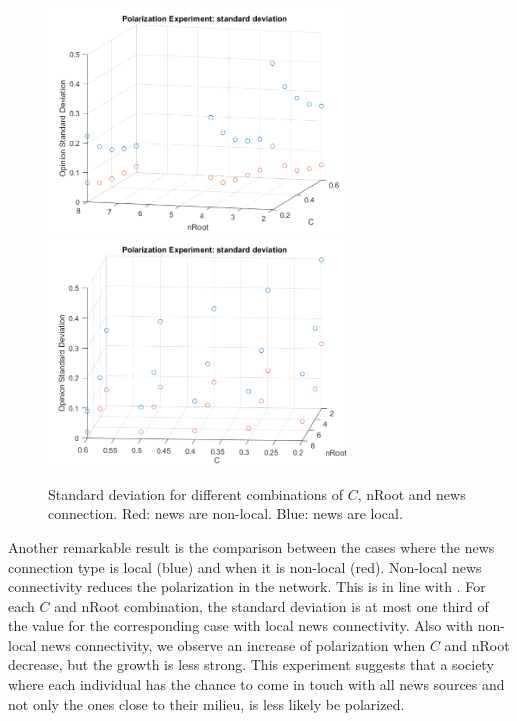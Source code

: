 \begin{figure}
\centering
\includegraphics[width=8cm]{Figures/pol_std1.png}
\includegraphics[width=8cm]{Figures/pol_std2.png}
\caption{Standard deviation for different combinations of $C$, nRoot and news connection. Red: news are non-local. Blue: news are local.}
\label{pics:pol_std}
\end{figure}


Another remarkable result is the comparison between the cases where the news connection type is local (blue) and when it is non-local (red). Non-local news connectivity reduces the polarization in the network. This is in line with \cite{Lee2014a}.
For each $C$ and nRoot combination, the standard deviation is at most one third of the value for the corresponding case with local news connectivity. Also with non-local news connectivity, we observe an increase of polarization when $C$ and nRoot decrease, but the growth is less strong. This experiment suggests that a society where each individual has the chance to come in touch with all news sources and not only the ones close to their milieu, is less likely be polarized.

